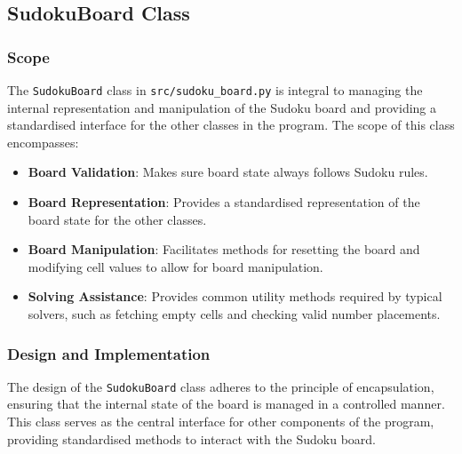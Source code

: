 \documentclass[11pt]{article}
\begin{document}
\subsection{SudokuBoard Class}

\subsubsection{Scope}
The \texttt{SudokuBoard} class in \texttt{src/sudoku\_board.py} is integral to managing the internal representation and manipulation of the Sudoku board and providing a standardised interface for the other classes in the program. The scope of this class encompasses:

\begin{itemize}
    \item \textbf{Board Validation}: Makes sure board state always follows Sudoku rules. 
    \item \textbf{Board Representation}: Provides a standardised representation of the board state for the other classes. 
    \item \textbf{Board Manipulation}: Facilitates methods for resetting the board and modifying cell values to allow for board manipulation.
    \item \textbf{Solving Assistance}: Provides common utility methods required by typical solvers, such as fetching empty cells and checking valid number placements.

\end{itemize}
\subsubsection{Design and Implementation}

The design of the \texttt{SudokuBoard} class adheres to the principle of encapsulation, ensuring that the internal state of the board is managed in a controlled manner. This class serves as the central interface for other components of the program, providing standardised methods to interact with the Sudoku board.
\end{document}

